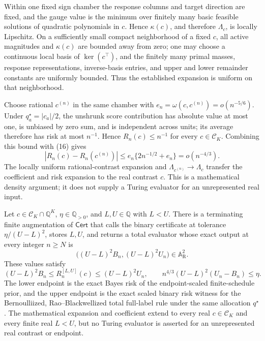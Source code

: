 Within one fixed sign chamber the response columns and target direction are fixed, and the gauge value is the minimum over finitely many basic feasible solutions of quadratic polynomials in \(c\).  Hence \(\kappa(c)\), and therefore \(\Lambda_c\), is locally Lipschitz.  On a sufficiently small compact neighborhood of a fixed \(c\), all active magnitudes and \(\kappa(c)\) are bounded away from zero; one may choose a continuous local basis of \(\ker(c^\top)\), and the finitely many primal masses, response representations, inverse-basis entries, and upper and lower remainder constants are uniformly bounded.  Thus the established expansion is uniform on that neighborhood.

Choose rational \(c^{(n)}\) in the same chamber with \(e_n=\omega(c,c^{(n)})=o(n^{-5/6})\).  Under \(q_a^\star=|c_a|/2\), the unshrunk score contribution has absolute value at most one, is unbiased by zero sum, and is independent across units; its average therefore has risk at most \(n^{-1}\).  Hence \(R_n(c)\le n^{-1}\) for every \(c\in\mathcal C_K\).  Combining this bound with (16) gives
\[
|R_n(c)-R_n(c^{(n)})|
\le e_n\{2n^{-1/2}+e_n\}
=o(n^{-4/3}).
\tag{17}
\]
The locally uniform rational-contrast expansion and \(\Lambda_{c^{(n)}}\to\Lambda_c\) transfer the coefficient and risk expansion to the real contrast \(c\).  This is a mathematical density argument; it does not supply a Turing evaluator for an unrepresented real input.

Let \(c\in\mathcal C_K\cap\mathbb Q^K\), \(\eta\in\mathbb Q_{>0}\), and \(L,U\in\mathbb Q\) with \(L<U\).  There is a terminating finite augmentation of \(\mathsf{Cert}\) that calls the binary certificate at tolerance \(\eta/(U-L)^2\), stores \(L,U\), and returns a total evaluator whose exact output at every integer \(n\ge N\) is
\[
\bigl((U-L)^2B_n,(U-L)^2U_n\bigr)\in\mathbb A_{\mathrm R}^2.
\]
These values satisfy
\[
(U-L)^2B_n\le R_n^{[L,U]}(c)\le (U-L)^2U_n,
\qquad
n^{4/3}(U-L)^2(U_n-B_n)\le\eta.
\]
The lower endpoint is the exact Bayes risk of the endpoint-scaled finite-schedule prior, and the upper endpoint is the exact scaled binary risk witness for the Bernoulliized, Rao--Blackwellized total full-label rule under the same allocation \(q^\star\).  The mathematical expansion and coefficient extend to every real \(c\in\mathcal C_K\) and every finite real \(L<U\), but no Turing evaluator is asserted for an unrepresented real contrast or endpoint.

